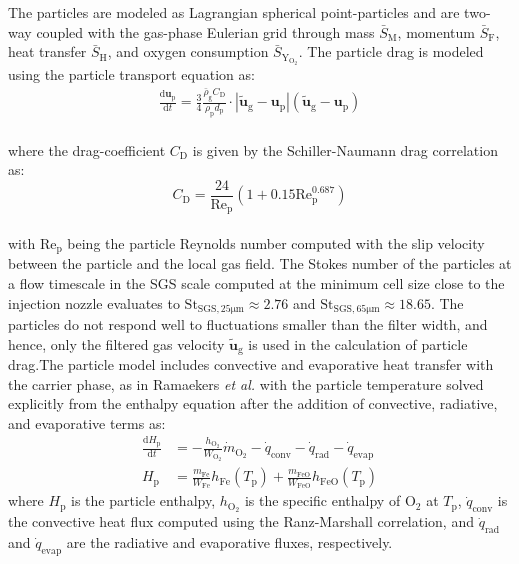 \documentclass[twocolumn,9pt]{article} %
\newcommand{\green}{}
\newcommand{\mrm}[1]{\mathrm{#1}}
\newcommand{\upd}{\mathrm{d}}                           %
\newcommand{\der}[2]{\frac{\upd #1}{\upd #2}}           %
\begin{document}
The particles are modeled as Lagrangian spherical point-particles and are two-way coupled with the gas-phase Eulerian grid through mass $\bar{S}_{\text{M}}$, momentum $\bar{S}_{\text{F}}$, heat transfer $\bar{S}_{\text{H}}$, and oxygen consumption $\bar{S}_{\mathrm{Y_\mrm{O_2}}}$. The particle drag is modeled using the particle transport equation as:
\begin{align}
    \frac{\text{d} \mathbf{u}_{\text{p}}}{\text{d} t} = \frac{3}{4} \frac{\bar{\rho}_{\text{g}} C_{\text{D}}}{\rho_{\text{p}} d_{\text{p}}} \cdot |\tilde{\mathbf{u}}_{\text{g}} - \mathbf{u}_{\text{p}}| (\tilde{\mathbf{u}}_{\text{g}} - \mathbf{u}_{\text{p}})
\end{align}\\[-6pt]
where the drag-coefficient $C_\mrm{D}$ is given by the Schiller-Naumann drag correlation \cite{schiller1933drag} as:
\begin{equation}
    C_{\text{D}} = \frac{24}{\text{Re}_\mrm{p}} \left(1 + 0.15 \text{Re}_\mrm{p}^{0.687}\right)
\end{equation}\\[-6pt]
with $\mrm{Re}_\mrm{p}$ being the particle Reynolds number computed with the slip velocity between the particle and the local gas field. {\green The Stokes number of the particles at a flow timescale in the SGS scale computed at the minimum cell size close to the injection nozzle evaluates to $\mrm{St}_\mrm{SGS,25\mu m} \approx 2.76$ and $\mrm{St}_\mrm{SGS,65\mu m} \approx 18.65$. The particles do not respond well to fluctuations smaller than the filter width, and hence, only the filtered gas velocity $\tilde{\mathbf{u}}_\mrm{g}$ is used in the calculation of particle drag.}{\green The particle model includes convective and evaporative heat transfer with the carrier phase, as in Ramaekers \emph{et al.} \cite{ramaekers2025} with the particle temperature solved explicitly from the enthalpy equation after the addition of convective, radiative, and evaporative terms as:
\begin{align}
    \der{H_\mrm{p}}{t} &= -\frac{h_\mrm{O_2}}{W_\mrm{O_2}} \dot{m}_\mrm{O_2} - \dot{q}_\mrm{conv} - \dot{q}_\mrm{rad} - \dot{q}_\mrm{evap} \\
    H_\mrm{p} &= \frac{m_\mrm{Fe}}{W_\mrm{Fe}} h_\mrm{Fe}(T_\mrm{p}) + \frac{m_\mrm{FeO}}{W_\mrm{FeO}} h_\mrm{FeO}(T_\mrm{p})
\end{align}
where $H_\mrm{p}$ is the particle enthalpy, $h_\mrm{O_2}$ is the specific enthalpy of $\mrm{O_2}$ at $T_\mrm{p}$, $\dot{q}_\mrm{conv}$ is the convective heat flux computed using the Ranz-Marshall correlation, 
and $\dot{q}_\mrm{rad}$ and $\dot{q}_\mrm{evap}$ are the radiative and evaporative fluxes, respectively. }
\end{document}
